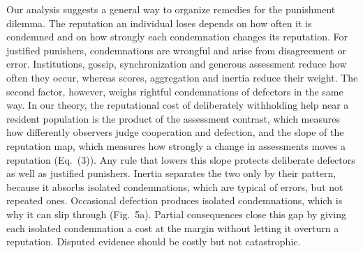 Our analysis suggests a general way to organize remedies for the punishment dilemma. The reputation an individual loses depends on how often it is condemned and on how strongly each condemnation changes its reputation. For justified punishers, condemnations are wrongful and arise from disagreement or error. Institutions, gossip, synchronization and generous assessment reduce how often they occur\cite{radzvilavicius2021,kawakatsu2024,murase2024synchronization,schmid2021}, whereas scores, aggregation and inertia reduce their weight\cite{schmid2023,michelmata2024}. The second factor, however, weighs rightful condemnations of defectors in the same way. In our theory, the reputational cost of deliberately withholding help near a resident population is the product of the assessment contrast, which measures how differently observers judge cooperation and defection, and the slope of the reputation map, which measures how strongly a change in assessments moves a reputation (Eq.~(3)). Any rule that lowers this slope protects deliberate defectors as well as justified punishers. Inertia separates the two only by their pattern, because it absorbs isolated condemnations, which are typical of errors, but not repeated ones. Occasional defection produces isolated condemnations, which is why it can slip through (Fig.~5a). Partial consequences close this gap by giving each isolated condemnation a cost at the margin without letting it overturn a reputation. Disputed evidence should be costly but not catastrophic.
